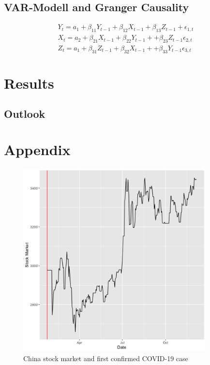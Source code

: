 \documentclass[11pt]{article}
\begin{document}
\subsection{VAR-Modell and Granger Causality}

$$
\begin{array}{l}
Y_{t}=a_{1}+\beta_{11} Y_{t-1}+\beta_{12} X_{t-1}+\beta_{13} Z_{t-1}+\epsilon_{1, t} \\
X_{t}=a_{2}+\beta_{21} X_{t-1}+\beta_{22} Y_{t-1}++\beta_{23} Z_{t-1}\epsilon_{2, t}\\
Z_{t}=a_{1}+\beta_{31} Z_{t-1}+\beta_{32} X_{t-1}++\beta_{33} Y_{t-1}\epsilon_{3, t}
\end{array}
$$
\section{Results}
\subsection{Outlook}



\section{Appendix}


\begin{figure}[h!]
\centering
  \includegraphics[width=100mm]{R-Code/plots/chinaFinance.png} 
  \caption{China stock market and first confirmed COVID-19 case}
\end{figure}
\end{document}
